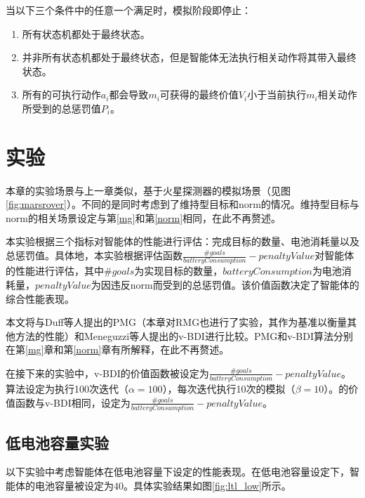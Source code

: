 当以下三个条件中的任意一个满足时，模拟阶段即停止：
\begin{enumerate}
  \item 所有状态机都处于最终状态。
  \item 并非所有状态机都处于最终状态，但是智能体无法执行相关动作将其带入最终状态。
  \item 所有的可执行动作$a_i$都会导致$m_i$可获得的最终价值$V_i$小于当前执行$m_i$相关动作所受到的总惩罚值$P_i$。
\end{enumerate}

\section{实验}
本章的实验场景与上一章类似，基于火星探测器的模拟场景（见图\ref{fig:marsrover}）。不同的是同时考虑到了维持型目标和norm的情况。维持型目标与norm的相关场景设定与第\ref{mg}和第\ref{norm}相同，在此不再赘述。

本实验根据三个指标对智能体的性能进行评估：完成目标的数量、电池消耗量以及总惩罚值。具体地，本实验根据评估函数$\frac{\#goals}{batteryConsumption} - penaltyValue$对智能体的性能进行评估，其中$\#goals$为实现目标的数量，$batteryConsumption$为电池消耗量，$penaltyValue$为因违反norm而受到的总惩罚值。该价值函数决定了智能体的综合性能表现。

本文将\SAN 与Duff等人\cite{DBLP:conf/atal/DuffHT06}提出的PMG（本章对RMG也进行了实验，其作为基准以衡量其他方法的性能）和Meneguzzi等人\cite{DBLP:journals/eaai/MeneguzziROVL15}提出的v-BDI进行比较。PMG和v-BDI算法分别在第\ref{mg}章和第\ref{norm}章有所解释，在此不再赘述。

在接下来的实验中，v-BDI的价值函数被设定为$\frac{\#goals}{batteryConsumption} - penaltyValue$。\SAN 算法设定为执行100次迭代（$\alpha = 100$），每次迭代执行10次的模拟（$\beta = 10$）。\SAN 的价值函数与v-BDI相同，设定为$\frac{\#goals}{batteryConsumption} - penaltyValue$。

\subsection{低电池容量实验}
以下实验中考虑智能体在低电池容量下设定的性能表现。在低电池容量设定下，智能体的电池容量被设定为40。具体实验结果如图\ref{fig:ltl_low}所示。

